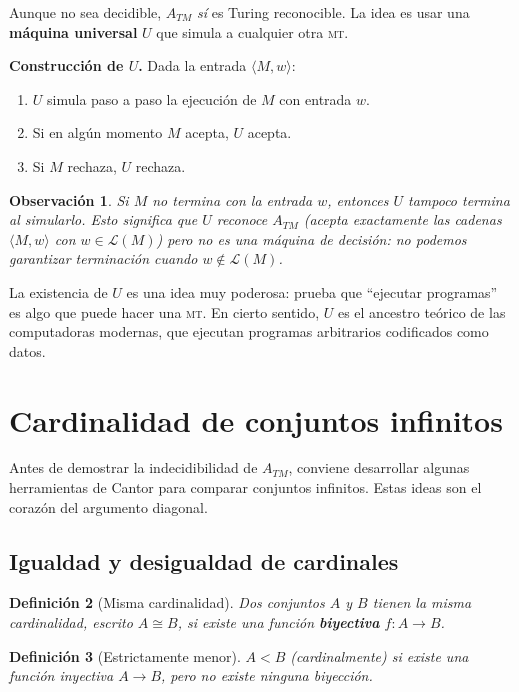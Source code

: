 \documentclass[11pt,a4paper]{article}
\theoremstyle{definicion}
\newtheorem{definicion}{Definición}[section]
\newtheorem{observacion}[definicion]{Observación}
\newcommand{\MT}{\textsc{mt}}
\newcommand{\enc}[1]{\langle #1 \rangle}
\begin{document}
Aunque no sea decidible, $A_{TM}$ \emph{sí} es Turing reconocible. La idea es usar una \textbf{máquina universal} $U$ que simula a cualquier otra \MT.

\textbf{Construcción de $U$.} Dada la entrada $\enc{M, w}$:
\begin{enumerate}
    \item $U$ simula paso a paso la ejecución de $M$ con entrada $w$.
    \item Si en algún momento $M$ acepta, $U$ acepta.
    \item Si $M$ rechaza, $U$ rechaza.
\end{enumerate}

\begin{observacion}
Si $M$ no termina con la entrada $w$, entonces $U$ tampoco termina al simularlo. Esto significa que $U$ \emph{reconoce} $A_{TM}$ (acepta exactamente las cadenas $\enc{M, w}$ con $w \in \mathcal{L}(M)$) pero no es una máquina de decisión: no podemos garantizar terminación cuando $w \notin \mathcal{L}(M)$.
\end{observacion}

\begin{intuicion}
La existencia de $U$ es una idea muy poderosa: prueba que ``ejecutar programas'' es algo que puede hacer una \MT. En cierto sentido, $U$ es el ancestro teórico de las computadoras modernas, que ejecutan programas arbitrarios codificados como datos.
\end{intuicion}

\section{Cardinalidad de conjuntos infinitos}

Antes de demostrar la indecidibilidad de $A_{TM}$, conviene desarrollar algunas herramientas de Cantor para comparar conjuntos infinitos. Estas ideas son el corazón del argumento diagonal.

\subsection{Igualdad y desigualdad de cardinales}

\begin{definicion}[Misma cardinalidad]
Dos conjuntos $A$ y $B$ tienen la misma cardinalidad, escrito $A \cong B$, si existe una función \textbf{biyectiva} $f : A \to B$.
\end{definicion}

\begin{definicion}[Estrictamente menor]
$A < B$ (cardinalmente) si existe una función inyectiva $A \to B$, pero \emph{no} existe ninguna biyección.
\end{definicion}
\end{document}
